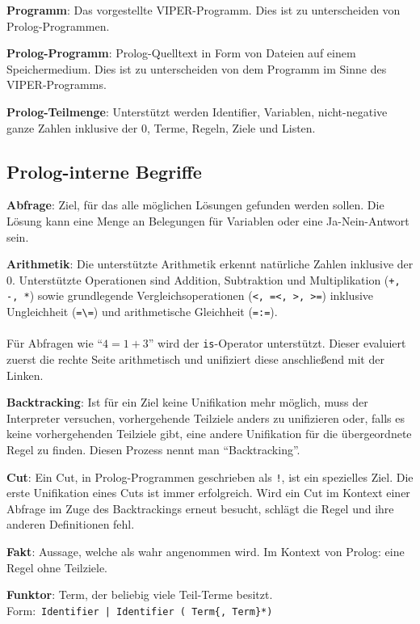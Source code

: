 \documentclass[parskip=full,11pt,twoside]{scrartcl}
\begin{document}
\textbf{Programm}:
Das vorgestellte VIPER-Programm. Dies ist zu unterscheiden von Prolog-Programmen.

\textbf{Prolog-Programm}:
Prolog-Quelltext in Form von Dateien auf einem Speichermedium. Dies ist zu unterscheiden von dem Programm im Sinne des VIPER-Programms.

\textbf{Prolog-Teilmenge}:
Unterstützt werden Identifier, Variablen, nicht-negative ganze Zahlen inklusive der 0, Terme, Regeln, Ziele und Listen.

\subsection{Prolog-interne Begriffe}
\textbf{Abfrage}:
Ziel, für das alle möglichen Lösungen gefunden werden sollen. Die Lösung kann eine Menge an Belegungen für Variablen oder eine Ja-Nein-Antwort sein.

\textbf{Arithmetik}:
Die unterstützte Arithmetik erkennt natürliche Zahlen inklusive der 0. Unterstützte Operationen sind Addition, Subtraktion und Multiplikation (\texttt{+, -, *}) sowie grundlegende Vergleichsoperationen (\texttt{<, =<, >, >=}) inklusive Ungleichheit (\texttt{=\textbackslash=}) und arithmetische Gleichheit (\texttt{=:=}).\\\\Für Abfragen wie \enquote{$4 = 1 + 3$} wird der \texttt{is}-Operator unterstützt. Dieser evaluiert zuerst die rechte Seite arithmetisch und unifiziert diese anschließend mit der Linken.

\textbf{Backtracking}:
Ist für ein Ziel keine Unifikation mehr möglich, muss der Interpreter versuchen, vorhergehende Teilziele anders zu unifizieren oder, falls es keine vorhergehenden Teilziele gibt, eine andere Unifikation für die übergeordnete Regel zu finden.
Diesen Prozess nennt man \enquote{Backtracking}.

\textbf{Cut}:
Ein Cut, in Prolog-Programmen geschrieben als \texttt{!}, ist ein spezielles Ziel.
Die erste Unifikation eines Cuts ist immer erfolgreich.
Wird ein Cut im Kontext einer Abfrage im Zuge des Backtrackings erneut besucht, schlägt die Regel und ihre anderen Definitionen fehl.

\textbf{Fakt}:
Aussage, welche als wahr angenommen wird. Im Kontext von Prolog: eine Regel ohne Teilziele.

\textbf{Funktor}:
Term, der beliebig viele Teil-Terme besitzt.\\Form:\ \texttt{Identifier | Identifier ( Term\{, Term\}*)}
\end{document}
